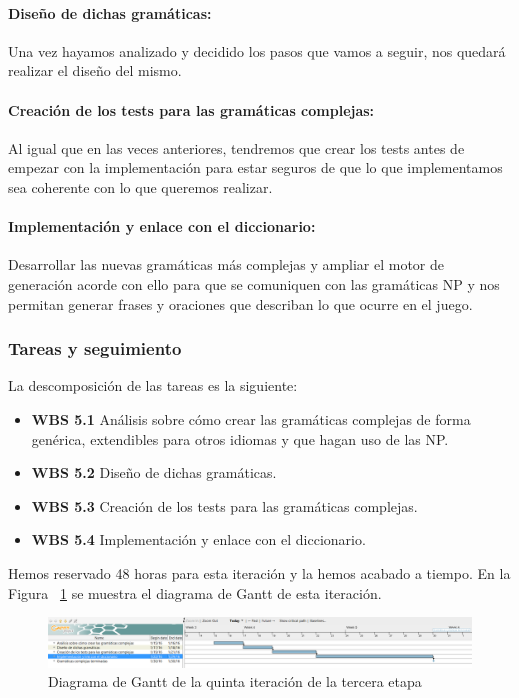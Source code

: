 \paragraph{Diseño de dichas gramáticas:} Una vez hayamos analizado y decidido los pasos que vamos a seguir, nos quedará realizar el diseño del mismo.

\paragraph{Creación de los tests para las gramáticas complejas:} Al igual que en las veces anteriores, tendremos que crear los tests antes de empezar con la implementación para estar seguros de que lo que implementamos sea coherente con lo que queremos realizar.

\paragraph{Implementación y enlace con el diccionario:} Desarrollar las nuevas gramáticas más complejas y ampliar el motor de generación acorde con ello para que se comuniquen con las gramáticas NP y nos permitan generar frases y oraciones que describan lo que ocurre en el juego.

\subsubsection{Tareas y seguimiento}

La descomposición de las tareas es la siguiente:

\begin{itemize}
  \item \textbf{WBS 5.1} Análisis sobre cómo crear las gramáticas complejas de forma genérica, extendibles para otros idiomas y que hagan uso de las NP.
  \item \textbf{WBS 5.2} Diseño de dichas gramáticas.
  \item \textbf{WBS 5.3} Creación de los tests para las gramáticas complejas.
  \item \textbf{WBS 5.4} Implementación y enlace con el diccionario.
\end{itemize}

\noindent Hemos reservado 48 horas para esta iteración y la hemos acabado a tiempo. En la Figura ~\ref{fig:sec3it5} se muestra el diagrama de Gantt de esta iteración.

\begin{figure}
    \includegraphics[width=\textwidth,height=\textheight,keepaspectratio]{./img/sec3it5.png}
  \caption{Diagrama de Gantt de la quinta iteración de la tercera etapa}
  \label{fig:sec3it5}
\end{figure}


